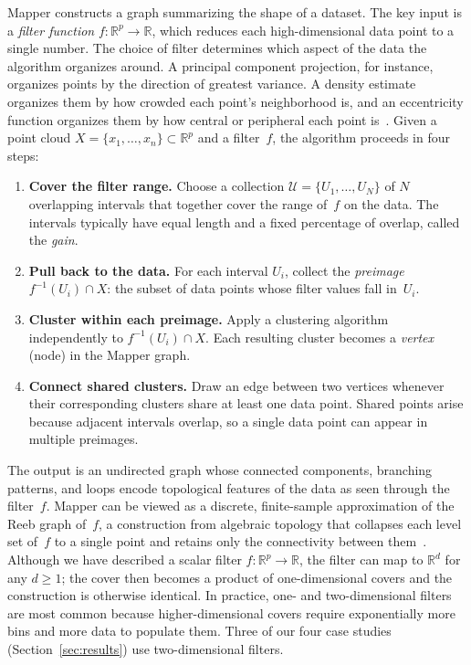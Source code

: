 \documentclass[hidelinks]{siamart251216}
\newcommand{\R}{\mathbb{R}}
\begin{document}
Mapper constructs a graph summarizing the shape of a dataset.  The key
input is a \emph{filter function} $f\colon \R^p \to \R$, which reduces
each high-dimensional data point to a single number.  The choice of
filter determines which aspect of the data the algorithm organizes
around.  A principal component projection, for instance, organizes points
by the direction of greatest variance.  A density estimate organizes
them by how crowded each point's neighborhood is, and an eccentricity
function organizes them by how central or peripheral each point
is~\citep{Singh2007, Lum2013}.  Given a point cloud
$X = \{x_1, \ldots, x_n\} \subset \R^p$ and a filter~$f$, the
algorithm proceeds in four steps:
\begin{enumerate}
\item[1.] \textbf{Cover the filter range.}  Choose a collection
  $\mathcal{U} = \{U_1, \ldots, U_N\}$ of $N$ overlapping intervals
  that together cover the range of~$f$ on the data.  The intervals
  typically have equal length and a fixed percentage of overlap, called
  the \emph{gain}.
\item[2.] \textbf{Pull back to the data.}  For each interval $U_i$,
  collect the \emph{preimage} $f^{-1}(U_i) \cap X$: the subset of data
  points whose filter values fall in~$U_i$.
\item[3.] \textbf{Cluster within each preimage.}  Apply a clustering
  algorithm independently to $f^{-1}(U_i) \cap X$.  Each resulting
  cluster becomes a \emph{vertex} (node) in the Mapper graph.
\item[4.] \textbf{Connect shared clusters.}  Draw an edge between two
  vertices whenever their corresponding clusters share at least one data
  point.  Shared points arise because adjacent intervals overlap, so a
  single data point can appear in multiple preimages.
\end{enumerate}
The output is an undirected graph whose connected components, branching
patterns, and loops encode topological features of the data as seen
through the filter~$f$.  Mapper can be viewed as a discrete,
finite-sample approximation of the Reeb graph of~$f$, a construction
from algebraic topology that collapses each level set of~$f$ to a
single point and retains only the connectivity between
them~\citep{Singh2007}.  Although we have described a scalar filter $f\colon \R^p \to \R$, the
filter can map to $\R^d$ for any $d \geq 1$; the cover then becomes a
product of one-dimensional covers and the construction is otherwise
identical.  In practice, one- and two-dimensional filters are most
common because higher-dimensional covers require exponentially more bins
and more data to populate them.  Three of our four case studies
(Section~\ref{sec:results}) use two-dimensional filters.
\end{document}
